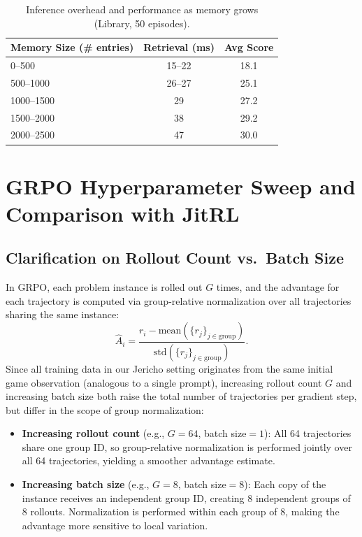\begin{table}[h]
\centering
\caption{Inference overhead and performance as memory grows (Library, 50 episodes).}
\label{tab:scalability}
\vskip 0.1in
\begin{tabular}{lcc}
\toprule
\textbf{Memory Size (\# entries)} & \textbf{Retrieval (ms)} & \textbf{Avg Score} \\
\midrule
0--500    & 15--22 & 18.1 \\
500--1000  & 26--27 & 25.1 \\
1000--1500 & 29     & 27.2 \\
1500--2000 & 38     & 29.2 \\
2000--2500 & 47     & 30.0 \\
\bottomrule
\end{tabular}
\end{table}

\section{GRPO Hyperparameter Sweep and Comparison with JitRL}
\label{app:grpo_sweep}

\subsection{Clarification on Rollout Count vs.\ Batch Size}

In GRPO, each problem instance is rolled out $G$ times, and the advantage for each trajectory is computed via group-relative normalization over all trajectories sharing the same instance:
\begin{equation}
    \hat{A}_i = \frac{r_i - \mathrm{mean}(\{r_j\}_{j \in \text{group}})}{\mathrm{std}(\{r_j\}_{j \in \text{group}})}.
\end{equation}
Since all training data in our Jericho setting originates from the same initial game observation (analogous to a single prompt), increasing rollout count $G$ and increasing batch size both raise the total number of trajectories per gradient step, but differ in the scope of group normalization:

\begin{itemize}[leftmargin=*,nosep]
    \item \textbf{Increasing rollout count} (e.g., $G{=}64$, batch size${=}1$): All 64 trajectories share one group ID, so group-relative normalization is performed jointly over all 64 trajectories, yielding a smoother advantage estimate.
    \item \textbf{Increasing batch size} (e.g., $G{=}8$, batch size${=}8$): Each copy of the instance receives an independent group ID, creating 8 independent groups of 8 rollouts. Normalization is performed within each group of 8, making the advantage more sensitive to local variation.
\end{itemize}

